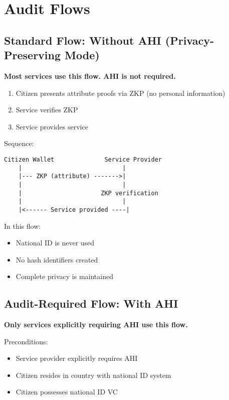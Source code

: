 \section{Audit Flows}

\subsection{Standard Flow: Without AHI (Privacy-Preserving Mode)}

\textbf{Most services use this flow. AHI is not required.}

\begin{enumerate}
  \item Citizen presents attribute proofs via ZKP (no personal information)
  \item Service verifies ZKP
  \item Service provides service
\end{enumerate}

Sequence:
\begin{verbatim}
Citizen Wallet              Service Provider
    |                            |
    |--- ZKP (attribute) ------->|
    |                            |
    |                      ZKP verification
    |                            |
    |<------ Service provided ----|
\end{verbatim}

In this flow:
\begin{itemize}
  \item National ID is never used
  \item No hash identifiers created
  \item Complete privacy is maintained
\end{itemize}

\subsection{Audit-Required Flow: With AHI}

\textbf{Only services explicitly requiring AHI use this flow.}

Preconditions:
\begin{itemize}
  \item Service provider explicitly requires AHI
  \item Citizen resides in country with national ID system
  \item Citizen possesses national ID VC
\end{itemize}


